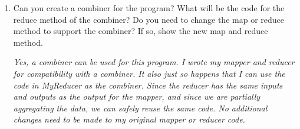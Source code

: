 \documentclass[11pt]{article}
\begin{document}
\begin{enumerate}
\begin{enumerate}
\begin{lstlisting}
		// Get the maximum temperature over the entire iterable
		for (IntWritable t : temps) {
			max = Integer.max(max, t.get());
		}

		context.write(date, new IntWritable(max));
	}
}
\end{lstlisting}

			\item Can you create a combiner for the program? What will be the code 
				for the reduce method of the combiner? Do you need to change the map 
				or reduce method to support the combiner? If so, show the new map and 
				reduce method.
				
				\textit{Yes, a combiner can be used for this program. I wrote my mapper 
				and reducer for compatibility with a combiner. It also just so happens 
				that I can use the code in MyReducer as the combiner. Since the reducer 
				has the same inputs and outputs as the output for the mapper, and since 
				we are partially aggregating the data, we can safely reuse the same 
				code. No additional changes need to be made to my original mapper or
				reducer code.}

		\end{enumerate}
\end{enumerate}
\end{document}
